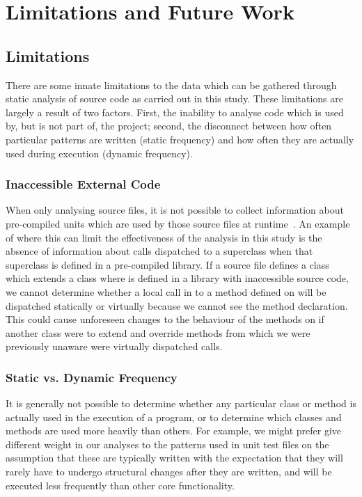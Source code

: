 \chapter{Limitations and Future Work}\label{C:future}

\section{Limitations}
There are some innate limitations to the data which can be gathered through static analysis of source code as carried out in this study. These limitations are largely a result of two factors. First, the inability to analyse code which is used by, but is not part of, the project; second, the disconnect between how often particular patterns are written (static frequency) and how often they are actually used during execution (dynamic frequency).

\subsection{Inaccessible External Code}
When only analysing source files, it is not possible to collect information about pre-compiled units which are used by those source files at runtime~\cite{StaticAnalysisLimits}. An example of where this can limit the effectiveness of the analysis in this study is the absence of information about calls dispatched to a superclass when that superclass is defined in a pre-compiled library. If a source file defines a class  which extends a class  where  is defined in a library with inaccessible source code, we cannot determine whether a local call in  to a method defined on  will be dispatched statically or virtually because we cannot see the method declaration. This could cause unforeseen changes to the behaviour of the methods on  if another class  were to extend  and override methods from  which we were previously unaware were virtually dispatched calls.

\subsection{Static vs. Dynamic Frequency}
It is generally not possible to determine whether any particular class or method is actually used in the execution of a program, or to determine which classes and methods are used more heavily than others. For example, we might prefer give different weight in our analyses to the patterns used in unit test files on the assumption that these are typically written with the expectation that they will rarely have to undergo structural changes after they are written, and will be executed less frequently than other core functionality.

